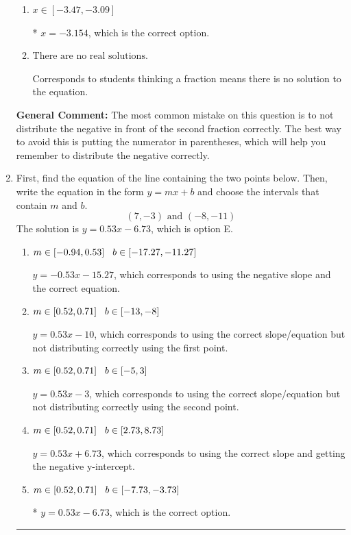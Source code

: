 \documentclass{extbook}[14pt]
\newcommand{\litem}[1]{\item #1

\rule{\textwidth}{0.4pt}}
\begin{document}
\begin{enumerate}
{\begin{enumerate}[label=\Alph*.]
$x = 0.600$, which corresponds to getting the negative of the actual solution.
\item \( x \in [-3.47, -3.09] \)

* $x = -3.154$, which is the correct option.
\item \( \text{There are no real solutions.} \)

Corresponds to students thinking a fraction means there is no solution to the equation.
\end{enumerate}

\textbf{General Comment:} The most common mistake on this question is to not distribute the negative in front of the second fraction correctly. The best way to avoid this is putting the numerator in parentheses, which will help you remember to distribute the negative correctly.
}
\litem{
First, find the equation of the line containing the two points below. Then, write the equation in the form $ y=mx+b $ and choose the intervals that contain $m$ and $b$.
\[ (7, -3) \text{ and } (-8, -11) \]The solution is \( y = 0.53x -6.73 \), which is option E.\begin{enumerate}[label=\Alph*.]
\item \( m \in [-0.94, 0.53] \hspace*{3mm} b \in [-17.27, -11.27] \)

 $y = -0.53x -15.27$, which corresponds to using the negative slope and the correct equation.
\item \( m \in [0.52, 0.71] \hspace*{3mm} b \in [-13, -8] \)

 $y = 0.53x -10$, which corresponds to using the correct slope/equation but not distributing correctly using the first point.
\item \( m \in [0.52, 0.71] \hspace*{3mm} b \in [-5, 3] \)

 $y = 0.53x -3$, which corresponds to using the correct slope/equation but not distributing correctly using the second point.
\item \( m \in [0.52, 0.71] \hspace*{3mm} b \in [2.73, 8.73] \)

 $y = 0.53x + 6.73$, which corresponds to using the correct slope and getting the negative y-intercept.
\item \( m \in [0.52, 0.71] \hspace*{3mm} b \in [-7.73, -3.73] \)

* $y = 0.53x -6.73$, which is the correct option.
\end{enumerate}

}
\end{enumerate}
\end{document}
